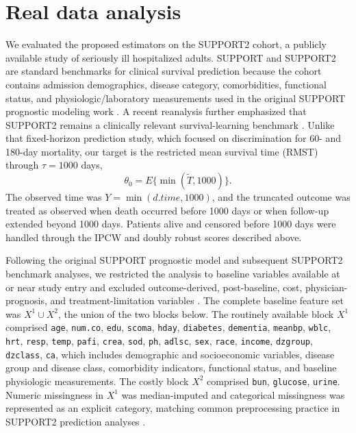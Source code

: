 \section{Real data analysis}

We evaluated the proposed estimators on the SUPPORT2 cohort, a publicly available study of seriously ill hospitalized adults. SUPPORT and SUPPORT2 are standard benchmarks for clinical survival prediction because the cohort contains admission demographics, disease category, comorbidities, functional status, and physiologic/laboratory measurements used in the original SUPPORT prognostic modeling work \cite{knaus1995support,uci_support2,harrell_support2}. A recent reanalysis further emphasized that SUPPORT2 remains a clinically relevant survival-learning benchmark \cite{truong2026support2}. Unlike that fixed-horizon prediction study, which focused on discrimination for 60- and 180-day mortality, our target is the restricted mean survival time (RMST) through $\tau=1000$ days,
\[
    \theta_0 = E\{\min(\tilde T,1000)\}.
\]
The observed time was $Y=\min(d.time,1000)$, and the truncated outcome was treated as observed when death occurred before 1000 days or when follow-up extended beyond 1000 days. Patients alive and censored before 1000 days were handled through the IPCW and doubly robust scores described above.

Following the original SUPPORT prognostic model and subsequent SUPPORT2 benchmark analyses, we restricted the analysis to baseline variables available at or near study entry and excluded outcome-derived, post-baseline, cost, physician-prognosis, and treatment-limitation variables \cite{knaus1995support,harrell_support2,truong2026support2}. The complete baseline feature set was \(X^1\cup X^2\), the union of the two blocks below. The routinely available block \(X^1\) comprised \texttt{age}, \texttt{num.co}, \texttt{edu}, \texttt{scoma}, \texttt{hday}, \texttt{diabetes}, \texttt{dementia}, \texttt{meanbp}, \texttt{wblc}, \texttt{hrt}, \texttt{resp}, \texttt{temp}, \texttt{pafi}, \texttt{crea}, \texttt{sod}, \texttt{ph}, \texttt{adlsc}, \texttt{sex}, \texttt{race}, \texttt{income}, \texttt{dzgroup}, \texttt{dzclass}, \texttt{ca}, which includes demographic and socioeconomic variables, disease group and disease class, comorbidity indicators, functional status, and baseline physiologic measurements. The costly block \(X^2\) comprised \texttt{bun}, \texttt{glucose}, \texttt{urine}. Numeric missingness in \(X^1\) was median-imputed and categorical missingness was represented as an explicit category, matching common preprocessing practice in SUPPORT2 prediction analyses \cite{truong2026support2}.

